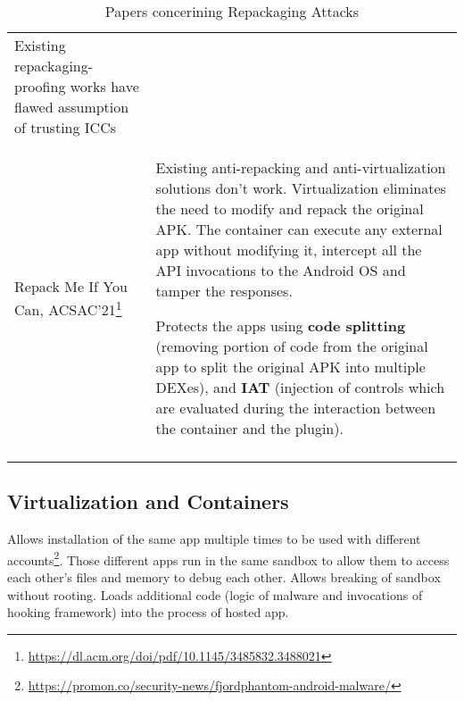\begin{longtable}{p{.3\linewidth}p{.65\linewidth}}
Existing repackaging-proofing works have flawed assumption of trusting ICCs
\\

Repack Me If You Can, ACSAC'21\footnote{\url{https://dl.acm.org/doi/pdf/10.1145/3485832.3488021}}
& Existing anti-repacking and anti-virtualization solutions don't work. Virtualization eliminates the need to modify and repack the original APK. The container can execute any external app without modifying it, intercept all the API invocations to the Android OS and tamper the responses. 

Protects the apps using \textbf{code splitting} (removing portion of code from the original app to split the original APK into multiple DEXes), and \textbf{IAT} (injection of controls which are evaluated during the interaction between the container and the plugin).
\\

\midrule
\caption{Papers concerining Repackaging Attacks} 
\label{tab:repackaingpapers}
\end{longtable}

\subsection{Virtualization and Containers}

Allows installation of the same app multiple times to be used with different accounts\footnote{\url{https://promon.co/security-news/fjordphantom-android-malware/}}. 
Those different apps run in the same sandbox to allow them to access each other's files and memory to debug each other. Allows breaking of sandbox without rooting.
Loads additional code (logic of malware and invocations of hooking framework) into the process of hosted app.


